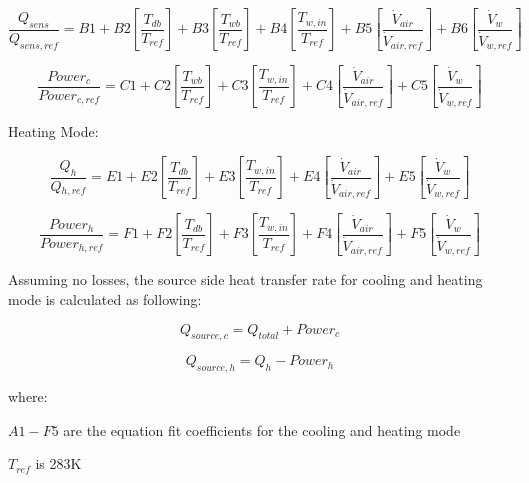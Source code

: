 \begin{equation}
\frac{{{Q_{sens}}}}{{{Q_{sens,ref}}}} = B1 + B2\left[ {\frac{{T{}_{db}}}{{T{}_{ref}}}} \right] + B3\left[ {\frac{{T{}_{wb}}}{{T{}_{ref}}}} \right] + B4\left[ {\frac{{T{}_{w,in}}}{{T{}_{ref}}}} \right] + B5\left[ {\frac{{{{\dot V}_{air}}}}{{{{\dot V}_{air,ref}}}}} \right] + B6\left[ {\frac{{\dot V{}_w}}{{\dot V{}_{w,ref}}}} \right]
\end{equation}

\begin{equation}
\frac{{Power{}_c}}{{Power{}_{c,ref}}} = C1 + C2\left[ {\frac{{{T_{wb}}}}{{{T_{ref}}}}} \right] + C3\left[ {\frac{{T{}_{w,in}}}{{T{}_{ref}}}} \right] + C4\left[ {\frac{{{{\dot V}_{air}}}}{{{{\dot V}_{air,ref}}}}} \right] + C5\left[ {\frac{{{{\dot V}_w}}}{{{{\dot V}_{w,ref}}}}} \right]
\end{equation}

Heating Mode:

\begin{equation}
\frac{{{Q_h}}}{{Q{}_{h,ref}}} = E1 + E2\left[ {\frac{{{T_{db}}}}{{{T_{ref}}}}} \right] + E3\left[ {\frac{{T{}_{w,in}}}{{T{}_{ref}}}} \right] + E4\left[ {\frac{{{{\dot V}_{air}}}}{{{{\dot V}_{air,ref}}}}} \right] + E5\left[ {\frac{{{{\dot V}_w}}}{{{{\dot V}_{w,ref}}}}} \right]
\end{equation}

\begin{equation}
\frac{{Power{_h}}}{{Power{}_{h,ref}}} = F1 + F2\left[ {\frac{{{T_{db}}}}{{{T_{ref}}}}} \right] + F3\left[ {\frac{{T{}_{w,in}}}{{T{}_{ref}}}} \right] + F4\left[ {\frac{{{{\dot V}_{air}}}}{{{{\dot V}_{air,ref}}}}} \right] + F5\left[ {\frac{{{{\dot V}_w}}}{{{{\dot V}_{w,ref}}}}} \right]
\end{equation}

Assuming no losses, the source side heat transfer rate for cooling and heating mode is calculated as following:

\begin{equation}
{Q_{source,c}} = {Q_{total}} + Powe{r_c}
\end{equation}

\begin{equation}
{Q_{source,h}} = {Q_h} - Powe{r_h}
\end{equation}

where:

\(A1 - F5\) are the equation fit coefficients for the cooling and heating mode

\({T_{ref}}\) is 283K

